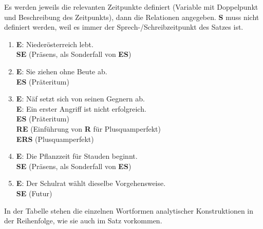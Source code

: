 Es werden jeweils die relevanten Zeitpunkte definiert (Variable mit Doppelpunkt und Beschreibung des Zeitpunkts), dann die Relationen angegeben.
\textbf{S} muss nicht definiert werden, weil es immer der Sprech-/Schreibzeitpunkt des Satzes ist.

\begin{enumerate}
  \item \textbf{E}: Niederösterreich lebt.\\
    \textbf{S\REq E} (Präsens, als Sonderfall von \textbf{E\RUn S})
  \item \textbf{E}: Sie ziehen ohne Beute ab.\\
    \textbf{E\RPr S} (Präteritum)
  \item \textbf{E}: Näf setzt sich von seinen Gegnern ab.\\
    \textbf{E}: Ein erster Angriff ist nicht erfolgreich.\\
    \textbf{E\RPr S} (Präteritum)\\
    \textbf{R\REq E} (Einführung von \textbf{R} für Plusquamperfekt)\\
    \textbf{E\RPr R\RPr S} (Plusquamperfekt)
  \item \textbf{E}: Die Pflanzzeit für Stauden beginnt.\\
    \textbf{S\RPr E} (Präsens, als Sonderfall von \textbf{E\RUn S})
  \item \textbf{E}: Der Schulrat wählt dieselbe Vorgehensweise.\\
    \textbf{S\RPr E} (Futur)
\end{enumerate}


In der Tabelle stehen die einzelnen Wortformen analytischer Konstruktionen in der Reihenfolge, wie sie auch im Satz vorkommen.

